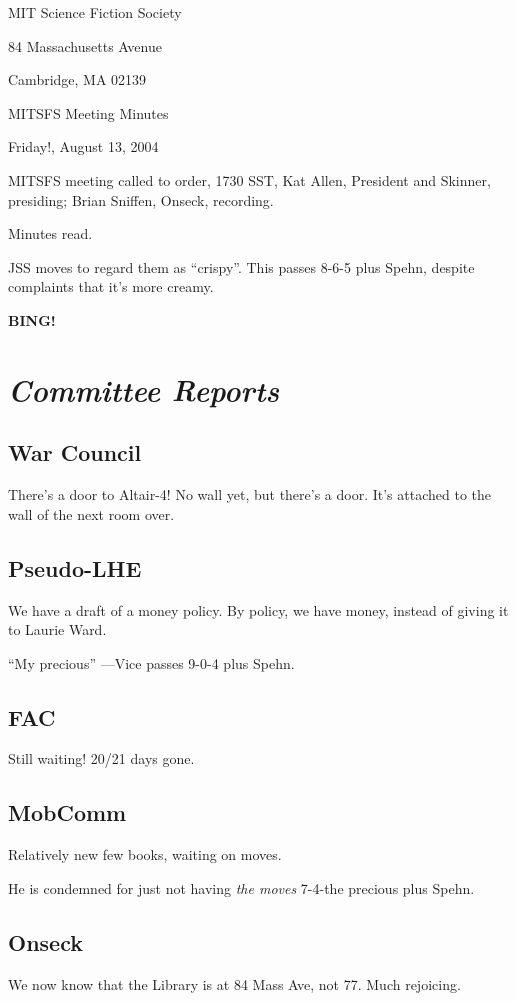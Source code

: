 \documentclass[10pt]{article}
\newcommand{\bing}{{\bf BING!} }
\newcommand{\goto}[1]{\bing \vskip 12pt \section*{{\em{#1}}}}
\newcommand{\ps}{ plus Spehn\xspace}
\begin{document}
\begin{center}

MIT Science Fiction Society 

84 Massachusetts Avenue

Cambridge, MA 02139

\vspace{12pt}

MITSFS Meeting Minutes 

Friday!, August 13, 2004

\end{center}
 
\vspace{18pt}

\setlength{\parskip}{6pt}

\noindent
MITSFS meeting called to order, 1730 SST, Kat Allen, President and
Skinner, presiding; Brian Sniffen,  Onseck, recording.

Minutes read.

JSS moves to regard them as ``crispy''.  This passes 8-6-5\ps, despite
complaints that it's more creamy.

\goto{Committee Reports}
\subsection*{War Council}
There's a door to Altair-4!  No wall yet, but there's a door.  It's
attached to the wall of the next room over.

\subsection*{Pseudo-LHE}
We have a draft of a money policy.  By policy, we have money, instead
of giving it to Laurie Ward.

``My precious'' ---Vice passes 9-0-4\ps.

\subsection*{FAC}
Still waiting!  20/21 days gone.

\subsection*{MobComm}
Relatively new few books, waiting on moves.

He is condemned for just not having \emph{the moves} 7-4-the precious\ps.

\subsection*{Onseck}
We now know that the Library is at 84 Mass Ave, not 77.  Much
rejoicing.
\end{document}
